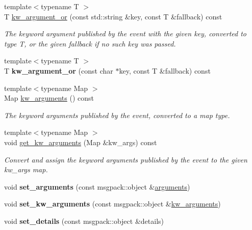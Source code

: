 \begin{DoxyCompactItemize}
\item 
{\footnotesize template$<$typename T $>$ }\\T \hyperlink{classautobahn_1_1wamp__event_aee963b0b4f1ee0a648bd32a9d808859e}{kw\+\_\+argument\+\_\+or} (const std\+::string \&key, const T \&fallback) const 
\begin{DoxyCompactList}\small\item\em The keyword argument published by the event with the given {\ttfamily key}, converted to type T, or the given {\ttfamily fallback} if no such key was passed. \end{DoxyCompactList}\item 
{\footnotesize template$<$typename T $>$ }\\T {\bfseries kw\+\_\+argument\+\_\+or} (const char $\ast$key, const T \&fallback) const \hypertarget{classautobahn_1_1wamp__event_a6f41d93d8ca0690dcc2820fb1bc23ed1}{}\label{classautobahn_1_1wamp__event_a6f41d93d8ca0690dcc2820fb1bc23ed1}

\item 
{\footnotesize template$<$typename Map $>$ }\\Map \hyperlink{classautobahn_1_1wamp__event_a731697bd7b1f20bf59482963341805f7}{kw\+\_\+arguments} () const 
\begin{DoxyCompactList}\small\item\em The keyword arguments published by the event, converted to a map type. \end{DoxyCompactList}\item 
{\footnotesize template$<$typename Map $>$ }\\void \hyperlink{classautobahn_1_1wamp__event_a179515512370e78effe89d55d3206581}{get\+\_\+kw\+\_\+arguments} (Map \&kw\+\_\+args) const 
\begin{DoxyCompactList}\small\item\em Convert and assign the keyword arguments published by the event to the given {\ttfamily kw\+\_\+args} map. \end{DoxyCompactList}\item 
void {\bfseries set\+\_\+arguments} (const msgpack\+::object \&\hyperlink{classautobahn_1_1wamp__event_add17b7623ab85ad698a333c5cfc0a554}{arguments})\hypertarget{classautobahn_1_1wamp__event_a40cd9656c3643794e115b577f61b8b95}{}\label{classautobahn_1_1wamp__event_a40cd9656c3643794e115b577f61b8b95}

\item 
void {\bfseries set\+\_\+kw\+\_\+arguments} (const msgpack\+::object \&\hyperlink{classautobahn_1_1wamp__event_a731697bd7b1f20bf59482963341805f7}{kw\+\_\+arguments})\hypertarget{classautobahn_1_1wamp__event_a1b9749ea58b11bfba5926fcc7306557c}{}\label{classautobahn_1_1wamp__event_a1b9749ea58b11bfba5926fcc7306557c}

\item 
void {\bfseries set\+\_\+details} (const msgpack\+::object \&details)\hypertarget{classautobahn_1_1wamp__event_ac44639c43e35211bb45e1e1477884e1c}{}\label{classautobahn_1_1wamp__event_ac44639c43e35211bb45e1e1477884e1c}

\end{DoxyCompactItemize}


